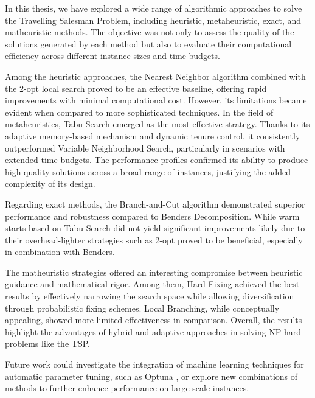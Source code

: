 In this thesis, we have explored a wide range of algorithmic approaches to solve the Travelling Salesman Problem, including heuristic, metaheuristic, exact, and matheuristic methods. 
The objective was not only to assess the quality of the solutions generated by each method but also to evaluate their computational efficiency across different instance sizes and time budgets.

Among the heuristic approaches, the Nearest Neighbor algorithm combined with the 2-opt local search proved to be an effective baseline, offering rapid improvements with minimal computational cost. However, its limitations became evident when compared to more sophisticated techniques.
In the field of metaheuristics, Tabu Search emerged as the most effective strategy. Thanks to its adaptive memory-based mechanism and dynamic tenure control, it consistently outperformed Variable Neighborhood Search, particularly in scenarios with extended time budgets. 
The performance profiles confirmed its ability to produce high-quality solutions across a broad range of instances, justifying the added complexity of its design.

Regarding exact methods, the Branch-and-Cut algorithm demonstrated superior performance and robustness compared to Benders Decomposition. 
While warm starts based on Tabu Search did not yield significant improvements-likely due to their overhead-lighter strategies such as 2-opt proved to be beneficial, especially in combination with Benders.

The matheuristic strategies offered an interesting compromise between heuristic guidance and mathematical rigor. Among them, Hard Fixing achieved the best results by effectively narrowing the search space while allowing diversification through probabilistic fixing schemes. Local Branching, while conceptually appealing, showed more limited effectiveness in comparison.
Overall, the results highlight the advantages of hybrid and adaptive approaches in solving NP-hard problems like the TSP. 

Future work could investigate the integration of machine learning techniques for automatic parameter tuning, such as Optuna \cite{optuna}, or explore new combinations of methods to further enhance performance on large-scale instances.

